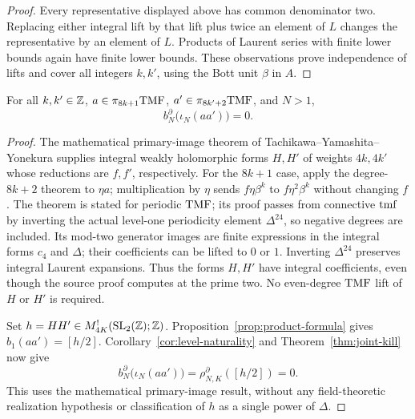 \begin{proof}
Every representative displayed above has common denominator two.
Replacing either integral lift by that lift plus twice an element
of $L$ changes the representative by an element of $L$. Products
of Laurent series with finite lower bounds again have finite lower
bounds. These observations prove independence of lifts and cover
all integers $k,k'$, using the Bott unit $\beta$ in $A$.
\end{proof}

\begin{corollary}\label{cor:Tachikawa}
For all $k,k'\in\mathbb Z$, $a\in\pi_{8k+1}\mathrm{TMF}$,
$a'\in\pi_{8k'+2}\mathrm{TMF}$, and $N>1$,
\[
 b_N^\partial\bigl(\iota_N(aa')\bigr)=0.
\]
\end{corollary}
\begin{proof}
The mathematical primary-image theorem of
Tachikawa--Yamashita--Yonekura
\cite[Section~4, Second statement, and Section~4.1]{TYYmod2}
supplies integral weakly holomorphic forms $H,H'$ of weights
$4k,4k'$ whose reductions are $f,f'$, respectively. For the
$8k+1$ case, apply the degree-$8k+2$ theorem to $\eta a$;
multiplication by $\eta$ sends $f\eta\beta^k$ to
$f\eta^2\beta^k$ without changing $f$.
The theorem is stated for periodic $\mathrm{TMF}$; its proof passes from
connective $\mathrm{tmf}$ by inverting the actual level-one periodicity
element $\Delta^{24}$, so negative degrees are included. Its mod-two generator images are
finite expressions in the integral forms $c_4$ and $\Delta$; their
coefficients can be lifted to $0$ or $1$. Inverting $\Delta^{24}$
preserves integral Laurent expansions. Thus the forms $H,H'$ have
integral coefficients, even though the source proof computes at
the prime two. No even-degree $\mathrm{TMF}$ lift of $H$ or $H'$ is required.

Set $h=HH'\in M_{4K}^{!}(\mathrm{SL}_2(\mathbb Z);\mathbb Z)$.
Proposition~\ref{prop:product-formula} gives $b_1(aa')=[h/2]$.
Corollary~\ref{cor:level-naturality} and
Theorem~\ref{thm:joint-kill} now give
\[
 b_N^\partial\bigl(\iota_N(aa')\bigr)
   =\rho_{N,K}^\partial([h/2])=0.
\]
This uses the mathematical primary-image result, without any
field-theoretic realization hypothesis or classification of $h$
as a single power of $\Delta$.
\end{proof}
